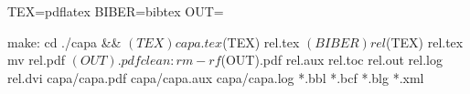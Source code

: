 TEX=pdflatex
BIBER=bibtex
OUT=

make:
	cd ./capa && $(TEX) capa.tex
	$(TEX) rel.tex
	$(BIBER) rel
	$(TEX) rel.tex
	mv rel.pdf $(OUT).pdf

clean:
	rm -rf $(OUT).pdf rel.aux rel.toc rel.out rel.log rel.dvi capa/capa.pdf capa/capa.aux capa/capa.log *.bbl *.bcf *.blg *.xml
